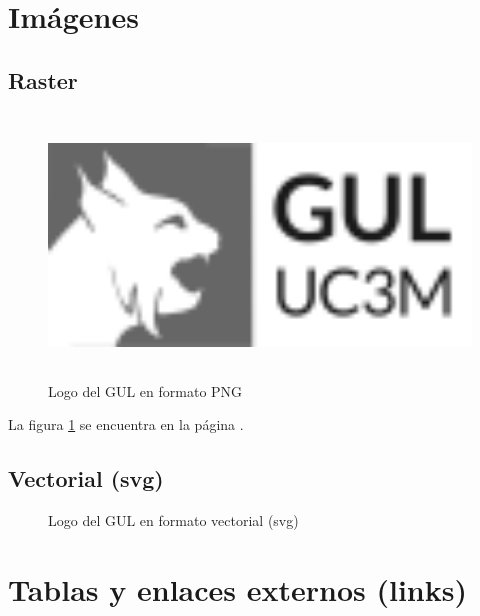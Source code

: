 


\section{Imágenes}

\subsection{Raster}

\begin{figure}[ht]
    \centering
    \includegraphics[height=7cm]{images/examples/gul_logo_raster.png}
    \caption{Logo del GUL en formato PNG}
    \label{fig:logo1}
\end{figure}

La figura \ref{fig:logo1} se encuentra en la página \pageref{fig:logo1}.

\newpage


\subsection{Vectorial (svg)}

\begin{figure}[ht]
     
     \centering
     \caption{Logo del GUL en formato vectorial (svg)}
     \label{fig:logo2}
\end{figure}



\section{Tablas y enlaces externos (links)}

